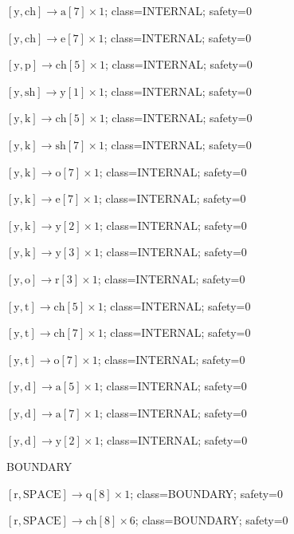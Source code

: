 \(\left[\mathrm{y}, \mathrm{ch}\right] \to \mathrm{a}[7] \times 1\); class=INTERNAL; safety=0\par
\(\left[\mathrm{y}, \mathrm{ch}\right] \to \mathrm{e}[7] \times 1\); class=INTERNAL; safety=0\par
\(\left[\mathrm{y}, \mathrm{p}\right] \to \mathrm{ch}[5] \times 1\); class=INTERNAL; safety=0\par
\(\left[\mathrm{y}, \mathrm{sh}\right] \to \mathrm{y}[1] \times 1\); class=INTERNAL; safety=0\par
\(\left[\mathrm{y}, \mathrm{k}\right] \to \mathrm{ch}[5] \times 1\); class=INTERNAL; safety=0\par
\(\left[\mathrm{y}, \mathrm{k}\right] \to \mathrm{sh}[7] \times 1\); class=INTERNAL; safety=0\par
\(\left[\mathrm{y}, \mathrm{k}\right] \to \mathrm{o}[7] \times 1\); class=INTERNAL; safety=0\par
\(\left[\mathrm{y}, \mathrm{k}\right] \to \mathrm{e}[7] \times 1\); class=INTERNAL; safety=0\par
\(\left[\mathrm{y}, \mathrm{k}\right] \to \mathrm{y}[2] \times 1\); class=INTERNAL; safety=0\par
\(\left[\mathrm{y}, \mathrm{k}\right] \to \mathrm{y}[3] \times 1\); class=INTERNAL; safety=0\par
\(\left[\mathrm{y}, \mathrm{o}\right] \to \mathrm{r}[3] \times 1\); class=INTERNAL; safety=0\par
\(\left[\mathrm{y}, \mathrm{t}\right] \to \mathrm{ch}[5] \times 1\); class=INTERNAL; safety=0\par
\(\left[\mathrm{y}, \mathrm{t}\right] \to \mathrm{ch}[7] \times 1\); class=INTERNAL; safety=0\par
\(\left[\mathrm{y}, \mathrm{t}\right] \to \mathrm{o}[7] \times 1\); class=INTERNAL; safety=0\par
\(\left[\mathrm{y}, \mathrm{d}\right] \to \mathrm{a}[5] \times 1\); class=INTERNAL; safety=0\par
\(\left[\mathrm{y}, \mathrm{d}\right] \to \mathrm{a}[7] \times 1\); class=INTERNAL; safety=0\par
\(\left[\mathrm{y}, \mathrm{d}\right] \to \mathrm{y}[2] \times 1\); class=INTERNAL; safety=0\par
BOUNDARY\par
\(\left[\mathrm{r}, \mathrm{SPACE}\right] \to \mathrm{q}[8] \times 1\); class=BOUNDARY; safety=0\par
\(\left[\mathrm{r}, \mathrm{SPACE}\right] \to \mathrm{ch}[8] \times 6\); class=BOUNDARY; safety=0\par
